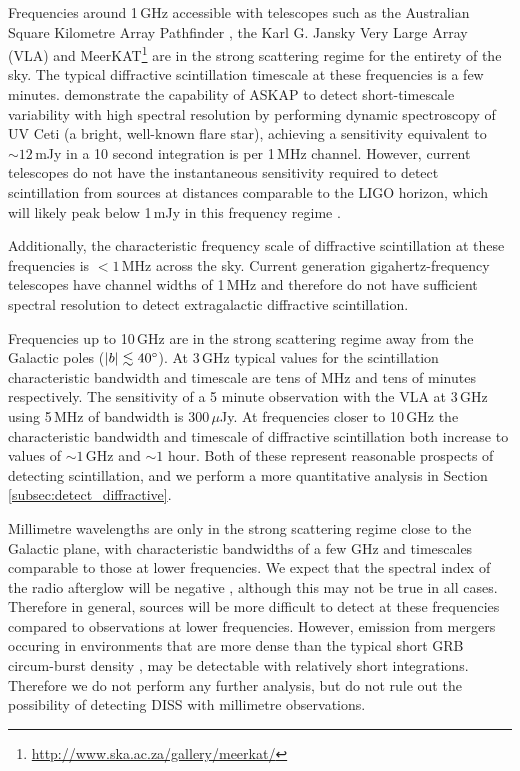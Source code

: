 Frequencies around 1\,GHz accessible with telescopes such as the Australian Square Kilometre Array Pathfinder \citep[ASKAP;][]{2008ExA....22..151J}, the Karl G. Jansky Very Large Array (VLA) and MeerKAT\footnote{\url{http://www.ska.ac.za/gallery/meerkat/}} are in the strong scattering regime for the entirety of the sky. The typical diffractive scintillation timescale at these frequencies is a few minutes. \citet{2019MNRAS.488..559Z} demonstrate the capability of ASKAP to detect short-timescale variability with high spectral resolution by performing dynamic spectroscopy of UV Ceti (a bright, well-known flare star), achieving a sensitivity equivalent to $\sim 12$\,mJy in a 10 second integration is per 1\,MHz channel. However, current telescopes do not have the instantaneous sensitivity required to detect scintillation from sources at distances comparable to the LIGO horizon, which will likely peak below 1\,mJy in this frequency regime \citep{2019PASA...36...19D}.

Additionally, the characteristic frequency scale of diffractive scintillation at these frequencies is $< 1$\,MHz across the sky. Current generation gigahertz-frequency telescopes have channel widths of 1\,MHz and therefore do not have sufficient spectral resolution to detect extragalactic diffractive scintillation.

Frequencies up to 10\,GHz are in the strong scattering regime away from the Galactic poles ($|b|\lesssim 40\mbox{$^\circ$}$). At 3\,GHz typical values for the scintillation characteristic bandwidth and timescale are tens of MHz and tens of minutes respectively. The sensitivity of a 5 minute observation with the VLA at 3\,GHz using 5\,MHz of bandwidth is $300\,\mu$Jy. At frequencies closer to 10\,GHz the characteristic bandwidth and timescale of diffractive scintillation both increase to values of $\sim 1\,$GHz and $\sim 1$ hour. Both of these represent reasonable prospects of detecting scintillation, and we perform a more quantitative analysis in Section \ref{subsec:detect_diffractive}.

Millimetre wavelengths are only in the strong scattering regime close to the Galactic plane, with characteristic bandwidths of a few GHz and timescales comparable to those at lower frequencies. We expect that the spectral index of the radio afterglow will be negative \citep{1998ApJ...497L..17S,2014ARA&A..52...43B}, although this may not be true in all cases. Therefore in general, sources will be more difficult to detect at these frequencies compared to observations at lower frequencies. However, emission from mergers occuring in environments that are more dense than the typical short GRB circum-burst density \citep[$n\sim 10^{-2}$\,cm$^{-3}$;][]{2015ApJ...815..102F}, may be detectable with relatively short integrations. Therefore we do not perform any further analysis, but do not rule out the possibility of detecting DISS with millimetre observations.

